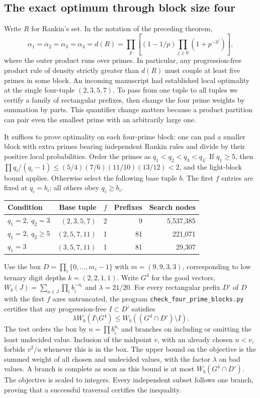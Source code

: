 \subsection{The exact optimum through block size four}
Write $R$ for Rankin's set. In the notation of the preceding theorem,
\[
       \alpha_1=\alpha_2=\alpha_3=\alpha_4
       =d(R)=\prod_p\left[(1-1/p)\prod_{j\ge0}(1+p^{-3^j})\right],
\]
where the outer product runs over primes.
In particular, any progression-free product rule of density strictly
greater than $d(R)$ must couple at least five primes in some block.
An incoming manuscript had established local optimality at the single
four-tuple $(2,3,5,7)$. To pass from one tuple to all tuples we certify
a family of rectangular prefixes, then change the four prime weights by
summation by parts. This quantifier change matters because a product
partition can pair even the smallest prime with an arbitrarily large one.

It suffices to prove optimality on each four-prime block: one can pad a
smaller block with extra primes bearing independent Rankin rules and
divide by their positive local probabilities. Order the primes as
$q_1<q_2<q_3<q_4$. If $q_1\ge5$, then
$\prod q_i/(q_i-1)\le(5/4)(7/6)(11/10)(13/12)<2$, and the light-block
bound applies. Otherwise select the following base tuple $b$.
The first $f$ entries are fixed at $q_i=b_i$; all others obey $q_i\ge b_i$.
\begin{center}\small
\begin{tabular}{lrrrr}
Condition & Base tuple & $f$ & Prefixes & Search nodes\\ \hline
$q_1=2,\ q_2=3$ & $(2,3,5,7)$ & 2 & 9 & 5,537,385\\
$q_1=2,\ q_2\ge5$ & $(2,5,7,11)$ & 1 & 81 & 221,071\\
$q_1=3$ & $(3,5,7,11)$ & 1 & 81 & 29,307
\end{tabular}
\end{center}

Use the box $D=\prod_i\{0,\ldots,m_i-1\}$ with
$m=(9,9,3,3)$, corresponding to low ternary digit depths
$k=(2,2,1,1)$. Write $G^4$ for the good vectors,
$W_b(J)=\sum_{a\in J}\prod_i b_i^{-a_i}$ and $\lambda=21/20$.
For every rectangular prefix $D'$ of $D$ with the first $f$ axes
untruncated, the program \texttt{check\_four\_prime\_blocks.py}
certifies that any progression-free $I\subset D'$ satisfies
\[
       \lambda W_b(I\setminus G^4)\le W_b((G^4\cap D')\setminus I).
       \tag{*}
\]
The test orders the box by $n=\prod b_i^{a_i}$ and branches on including
or omitting the least undecided value. Inclusion of the midpoint $v$,
with an already chosen $u<v$, forbids $v^2/u$ whenever this is in the
box. The upper bound on the objective is the summed weight of all chosen
and undecided values, with the factor $\lambda$ on bad values. A branch
is complete as soon as this bound is at most $W_b(G^4\cap D')$.
The objective is scaled to integers. Every independent subset follows
one branch, proving that a successful traversal certifies the inequality.

